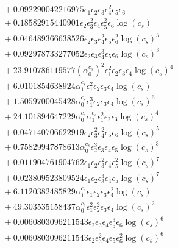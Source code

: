 \documentclass[10pt]{article}
\begin{document}
\begin{align*}
&{}  + 0.092290042216975 \epsilon_{1} \epsilon_{2} \epsilon_{3} \epsilon_{4}^{2} \epsilon_{5} \epsilon_{6} \\
&{}  + 0.18582915440901 \epsilon_{2} \epsilon_{3}^{2} \epsilon_{4} \epsilon_{5}^{2} \epsilon_{6} \log{\left(c_{s} \right)} \\
&{}  + 0.046489366638526 \epsilon_{2} \epsilon_{3} \epsilon_{4}^{2} \epsilon_{5} \epsilon_{6}^{2} \log{\left(c_{s} \right)}^{3} \\
&{}  + 0.092978733277052 \epsilon_{2} \epsilon_{3} \epsilon_{4}^{3} \epsilon_{5} \epsilon_{6} \log{\left(c_{s} \right)}^{3} \\
&{}  + 23.910786119577 \left(\alpha_{0}^{c_s}\right)^{2} \epsilon_{1}^{2} \epsilon_{2} \epsilon_{3} \epsilon_{4} \log{\left(c_{s} \right)}^{4} \\
&{}  + 6.0101854638924 \alpha_{1}^{c_s} \epsilon_{1}^{2} \epsilon_{2} \epsilon_{3} \epsilon_{4} \log{\left(c_{s} \right)} \\
&{}  + 1.5059700045428 \alpha_{0}^{c_s} \epsilon_{1}^{3} \epsilon_{2} \epsilon_{3} \epsilon_{4} \log{\left(c_{s} \right)}^{6} \\
&{}  + 24.101894647229 \alpha_{0}^{c_s} \alpha_{1}^{c_s} \epsilon_{1}^{2} \epsilon_{2} \epsilon_{3} \log{\left(c_{s} \right)}^{4} \\
&{}  + 0.047140706622919 \epsilon_{2} \epsilon_{3}^{2} \epsilon_{4}^{2} \epsilon_{5} \epsilon_{6} \log{\left(c_{s} \right)}^{5} \\
&{}  + 0.75829947878613 \alpha_{0}^{c_s} \epsilon_{2}^{3} \epsilon_{3} \epsilon_{4} \epsilon_{5} \log{\left(c_{s} \right)}^{3} \\
&{}  + 0.011904761904762 \epsilon_{1} \epsilon_{2} \epsilon_{3}^{2} \epsilon_{4} \epsilon_{5}^{2} \log{\left(c_{s} \right)}^{7} \\
&{}  + 0.023809523809524 \epsilon_{1} \epsilon_{2} \epsilon_{3}^{3} \epsilon_{4} \epsilon_{5} \log{\left(c_{s} \right)}^{7} \\
&{}  + 6.1120382485829 \alpha_{1}^{c_s} \epsilon_{1} \epsilon_{2} \epsilon_{3} \epsilon_{4}^{2} \log{\left(c_{s} \right)} \\
&{}  + 49.303535158437 \alpha_{0}^{c_s} \epsilon_{1}^{2} \epsilon_{2}^{2} \epsilon_{3} \epsilon_{4} \log{\left(c_{s} \right)}^{2} \\
&{}  + 0.0060803096211543 \epsilon_{2} \epsilon_{3} \epsilon_{4} \epsilon_{5}^{3} \epsilon_{6} \log{\left(c_{s} \right)}^{6} \\
&{}  + 0.0060803096211543 \epsilon_{2} \epsilon_{3}^{2} \epsilon_{4} \epsilon_{5} \epsilon_{6}^{2} \log{\left(c_{s} \right)}^{6} \\

\end{align*}
\end{document}
